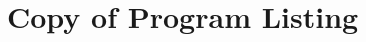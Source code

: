 \documentclass[letterpaper,12pt]{article}
\begin{document}

\newpage
\appendix
\section{Copy of Program Listing}
\label{appendix-code}



\end{document}

